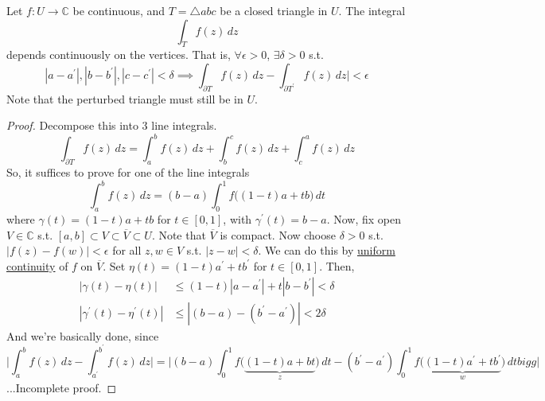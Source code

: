 	\begin{lemma}
	  \label{thm:triangle-integral-under-vertex-perturbation}
 
		Let $f: U \to \mathbb{C}$ be continuous, and $T = \triangle abc$ be a closed triangle in $U$. The integral 
		\begin{equation}
		  \int_T f(z) \,dz
		\end{equation} 
		depends continuously on the vertices. That is, $\forall \epsilon > 0$, $\exists \delta > 0$ s.t. 
		\begin{equation}
			|a - a^\prime|, |b - b^\prime|, |c - c^\prime| < \delta \implies \int_{\partial T} f(z) \,dz - \int_{\partial T^\prime} f(z) \,dz \bigg| < \epsilon
		\end{equation}
		Note that the perturbed triangle must still be in $U$. 
	\end{lemma}
	\begin{proof}
	  Decompose this into 3 line integrals. 
		\begin{equation}
			\int_{\partial T} f(z) \,dz = \int_a^b f(z) \,dz + \int_b^c f(z) \,dz + \int_c^a f(z) \,dz 
		\end{equation}
		So, it suffices to prove for one of the line integrals 
		\begin{equation}
		  \int_a^b f(z) \,dz = (b - a) \int_0^1 f \big((1 - t)a + tb \big) \,dt 
		\end{equation} 
		where $\gamma(t) = (1 - t) a + tb$ for $t \in [0, 1]$, with $\gamma^\prime(t) = b - a$. Now, fix open $V \in \mathbb{C}$ s.t. $[a, b] \subset V \subset \overline{V} \subset U$. Note that $\overline{V}$ is compact. Now choose $\delta > 0$ s.t. $|f(z) - f(w)| < \epsilon$ for all $z, w \in V$ s.t. $|z - w| < \delta$. We can do this by \hyperref[real-def:uniform-continuity]{uniform continuity} of $f$ on $\overline{V}$. Set $\eta(t) = (1 - t)a^\prime + t b^\prime$ for $t \in [0, 1]$. Then, 
		\begin{align}
			|\gamma(t) - \eta(t)| & \leq (1 - t) |a - a^\prime| + t |b - b^\prime| < \delta  \\ 
			|\gamma^\prime (t) - \eta^\prime (t)| & \leq |(b - a) - (b^\prime - a^\prime)| < 2 \delta
		\end{align} 
		And we're basically done, since 
		\begin{equation}
			\bigg| \int_a^b f(z) \,dz - \int_{a^\prime}^{b^\prime} f(z) \,dz \bigg| = \bigg| (b - a) \int_0^1 f \big( \underbrace{(1 - t)a + bt}_{z} \big) \,dt - (b^\prime - a^\prime) \int_0^1 f\big( \underbrace{(1 - t)a^\prime + t b^\prime }_{w} \big) \,dt bigg|
		\end{equation}
		...Incomplete proof.
	\end{proof}

